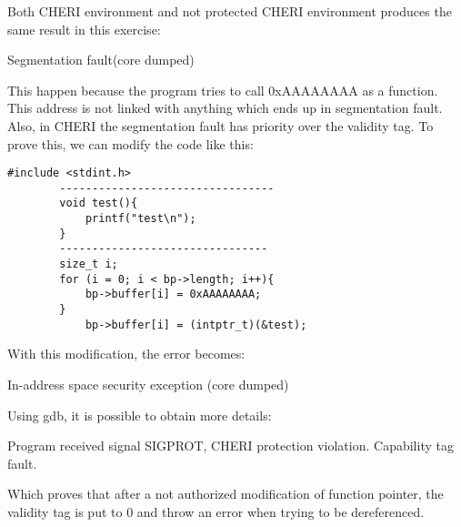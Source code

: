 \documentclass[a4paper, 11pt]{article}
\begin{document}
	Both CHERI environment and not protected CHERI environment produces the same result in this exercise:
	\begin{tcolorbox}[colback=gray!5!white, colframe=gray!75!black, title=Output On both environment]
	Segmentation fault(core dumped)
	\end{tcolorbox}
	This happen because the program tries to call 0xAAAAAAAA as a function. This address is not linked with anything which ends up in segmentation fault.
	Also, in CHERI the segmentation fault has priority over the validity tag. To prove this, we can modify the code like this:


	\begin{lstlisting}[caption=Control flow modified C Code]
		#include <stdint.h>
		---------------------------------
		void test(){
			printf("test\n");
		}
		--------------------------------
		size_t i;
		for (i = 0; i < bp->length; i++){
        	bp->buffer[i] = 0xAAAAAAAA;
		}
        	bp->buffer[i] = (intptr_t)(&test);
	\end{lstlisting}
	With this modification, the error becomes:
	\begin{tcolorbox}[colback=gray!5!white, colframe=blue!75!black, title=Output of modified Code run with CHERI protection ]
		In-address space security exception (core dumped)
	\end{tcolorbox}
	Using gdb, it is possible to obtain more details: 
	\begin{tcolorbox}[colback=gray!5!white, colframe=black!75!black, title=GDB Output of modified Code run with CHERI protection ]
		Program received signal SIGPROT, CHERI protection violation.
		Capability tag fault.
	\end{tcolorbox}
	Which proves that after a not authorized modification of function pointer, the validity tag is put to 0 and throw an error when trying to be dereferenced.
	
\end{document}
